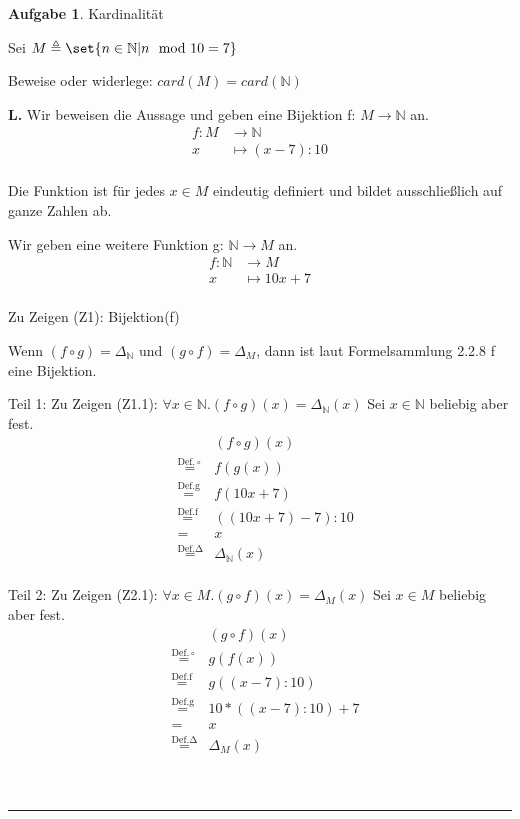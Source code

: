 \documentclass[10pt,leqno ]{article}
\DeclarePairedDelimiter\set\{\}
\newcommand\customeq[1]{\overset{\mathrm{#1}}{=}}
\theoremstyle{definition}
\newtheorem{problem}[theorem]{Aufgabe}
\newenvironment{solution}[1][L]{\begin{doublespace}\textbf{#1.}\quad }{\ \rule{0.5em}{0.5em}\end{doublespace}}
\begin{document}
\begin{problem}
Kardinalität

Sei \(M \triangleq \set{n \in \mathbb{N} | n \mod 10 = 7}\)

Beweise oder widerlege: \(card(M) = card(\mathbb{N})\)
\end{problem}
\begin{solution}
Wir beweisen die Aussage und geben eine Bijektion f: \(M \rightarrow \mathbb{N}\) an.
\begin{align*}
    f: M &\rightarrow \mathbb{N} \\
    x &\mapsto (x - 7) : 10 \\ 
\end{align*}

Die Funktion ist für jedes \(x \in M\) eindeutig definiert und bildet ausschließlich auf ganze Zahlen ab.

Wir geben eine weitere Funktion g: \(\mathbb{N} \rightarrow M\) an.
\begin{align*}
    f: \mathbb{N} &\rightarrow M \\
    x &\mapsto 10x + 7 \\ 
\end{align*}

Zu Zeigen (Z1): Bijektion(f)

Wenn \((f \circ g) = \Delta_\mathbb{N} \) und \((g \circ f) = \Delta_M \), dann ist laut Formelsammlung 2.2.8 f eine Bijektion.

Teil 1: Zu Zeigen (Z1.1): \(\forall x \in \mathbb{N} . (f \circ g)(x) = \Delta_\mathbb{N}(x) \)
Sei \(x \in \mathbb{N}\) beliebig aber fest.
\begin{equation*}
    \begin{aligned}
    && (f \circ g)(x) \\
    & \customeq{Def. \circ} & f(g(x)) \\
    & \customeq{Def. g} & f(10x + 7) \\
    & \customeq{Def. f} & ((10x + 7) - 7) : 10 \\
    & = & x \\
    & \customeq{Def. \Delta} & \Delta_\mathbb{N}(x) \\
    \end{aligned}
\end{equation*}

Teil 2: Zu Zeigen (Z2.1):  \(\forall x \in M . (g \circ f)(x) = \Delta_M(x) \)
Sei \(x \in M\) beliebig aber fest.
\begin{equation*}
    \begin{aligned}
    && (g \circ f)(x) \\
    & \customeq{Def. \circ} & g(f(x)) \\
    & \customeq{Def. f} & g((x - 7) : 10) \\
    & \customeq{Def. g} & 10*((x-7):10) + 7 \\
    & = & x \\
    & \customeq{Def. \Delta} & \Delta_M(x) \\
    \end{aligned}
\end{equation*}


\end{solution}
\end{document}

